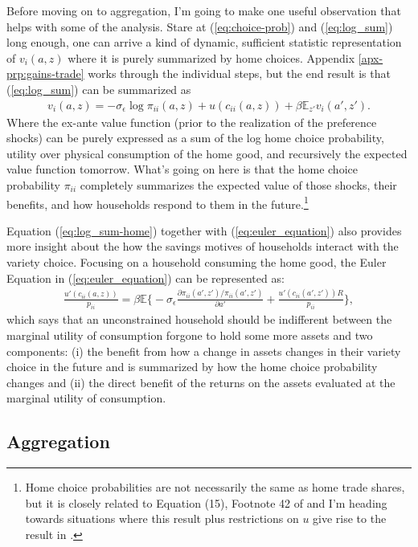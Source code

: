 \documentclass[12pt,pdftex]{article}
\begin{document}
\begin{onehalfspacing}
Before moving on to aggregation, I'm going to make one useful observation that helps with some of the analysis. Stare at (\ref{eq:choice-prob}) and (\ref{eq:log_sum}) long enough, one can arrive a kind of dynamic, sufficient statistic representation of $v_i(a, z)$ where it is purely summarized by home choices. Appendix \ref{apx-prp:gains-trade} works through the individual steps, but the end result is that (\ref{eq:log_sum}) can be summarized as
\begin{align}
v_i(a, z) = -\sigma_{\epsilon} \log \pi_{ii}(a,z) + u(c_{ii}(a,z)) + \beta \mathbb{E}_{z'} v_{i}(a',z').
\label{eq:log_sum-home}
\end{align}
Where the ex-ante value function (prior to the realization of the preference shocks) can be purely expressed as a sum of the log home choice probability, utility over physical consumption of the home good, and recursively the expected value function tomorrow. What's going on here is that the home choice probability $\pi_{ii}$ completely summarizes the expected value of those shocks, their benefits, and how households respond to them in the future.\footnote{Home choice probabilities are not necessarily the same as home trade shares, but it is closely related to Equation (15), Footnote 42 of \citet{eaton2002technology} and I'm heading towards situations where this result plus restrictions on $u$ give rise to the result in \citet{arkolakis2012new}.}

Equation (\ref{eq:log_sum-home}) together with (\ref{eq:euler_equation}) also provides more insight about the how the savings motives of households interact with the variety choice. Focusing on a household consuming the home good, the Euler Equation in (\ref{eq:euler_equation}) can be represented as:
\begin{align}
\frac{u'(c_{ii}(a,z))}{p_{ii}} = \beta \mathbb{E} \bigg \{ -\sigma_{\epsilon} \frac{\partial \pi_{ii}(a',z') / \pi_{ii}(a',z')}{\partial a'} + \frac{u'(c_{ii}(a',z'))R}{p_{ii}} \bigg \},
\label{eq:euler_equation-home}
\end{align}
which says that an unconstrained household should be indifferent between the marginal utility of consumption forgone to hold some more assets and two components: (i) the benefit from how a change in assets changes in their variety choice in the future and is summarized by how the home choice probability changes and (ii) the direct benefit of the returns on the assets evaluated at the marginal utility of consumption.

\subsection{Aggregation}


\end{onehalfspacing}
\end{document}
